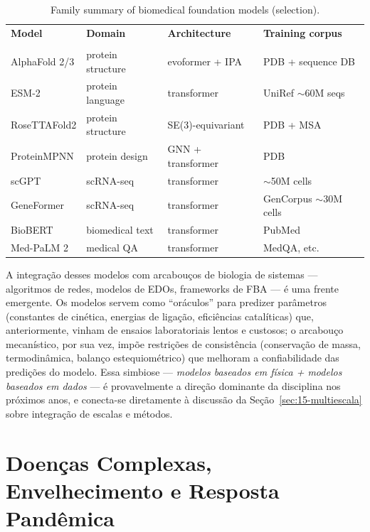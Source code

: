 \begin{table}[h]
\centering
\caption{Family summary of biomedical foundation models (selection).}
\label{tab:15-ia-models}
\begin{tabular}{llll}
\hline
\textbf{Model} & \textbf{Domain} & \textbf{Architecture} & \textbf{Training corpus} \\\\
\hline
AlphaFold 2/3 & protein structure & evoformer + IPA & PDB + sequence DB \\
ESM-2 & protein language & transformer & UniRef \(\sim\)60M seqs \\
RoseTTAFold2 & protein structure & SE(3)-equivariant & PDB + MSA \\
ProteinMPNN & protein design & GNN + transformer & PDB \\
scGPT & scRNA-seq & transformer & \(\sim\)50M cells \\
GeneFormer & scRNA-seq & transformer & GenCorpus \(\sim\)30M cells \\
BioBERT & biomedical text & transformer & PubMed \\
Med-PaLM 2 & medical QA & transformer & MedQA, etc. \\
\hline
\end{tabular}
\end{table}

A integração desses modelos com arcabouços de biologia de sistemas --- algoritmos de redes, modelos de EDOs, frameworks de FBA --- é uma frente emergente. Os modelos servem como ``oráculos'' para predizer parâmetros (constantes de cinética, energias de ligação, eficiências catalíticas) que, anteriormente, vinham de ensaios laboratoriais lentos e custosos; o arcabouço mecanístico, por sua vez, impõe restrições de consistência (conservação de massa, termodinâmica, balanço estequiométrico) que melhoram a confiabilidade das predições do modelo. Essa simbiose --- \emph{modelos baseados em física + modelos baseados em dados} --- é provavelmente a direção dominante da disciplina nos próximos anos, e conecta-se diretamente à discussão da Seção~\ref{sec:15-multiescala} sobre integração de escalas e métodos.



\section{Doenças Complexas, Envelhecimento e Resposta Pandêmica}
\label{sec:15-doencas}

